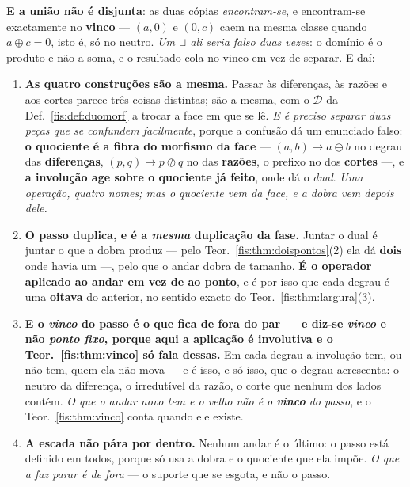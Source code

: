 \documentclass[livro.tex]{subfiles}
\begin{document}
\begin{teorema}
\smallskip\noindent\textbf{E a união não é disjunta}: as duas cópias
\emph{encontram-se}, e encontram-se exactamente no \textbf{vinco} --- $(a,0)$ e
$(0,c)$ caem na mesma classe quando $a\oplus c=0$, isto é, só no neutro. \emph{Um
$\sqcup$ ali seria falso duas vezes}: o domínio é o produto e não a soma, e o
resultado cola no vinco em vez de separar. E daí:
\begin{enumerate}\itemsep3pt
\item[(1)] \textbf{As quatro construções são a mesma.} Passar às diferenças, às
razões e aos cortes parece três coisas distintas; são a mesma, com o
$\mathcal{D}$ da Def.~\ref{fis:def:duomorf} a trocar a face em que se lê.
\emph{E é preciso separar duas peças que se confundem facilmente}, porque a
confusão dá um enunciado falso: \textbf{o quociente é a fibra do morfismo da
face} --- $(a,b)\mapsto a\ominus b$ no degrau das \textbf{diferenças},
$(p,q)\mapsto p\oslash q$ no das \textbf{razões}, o prefixo no dos
\textbf{cortes} ---, e \textbf{a involução age sobre o
quociente já feito}, onde dá o \emph{dual}. \emph{Uma operação, quatro nomes; mas
o quociente vem da face, e a dobra vem depois dele.}
\item[(2)] \textbf{O passo duplica, e é a \emph{mesma} duplicação da fase.}
Juntar o dual é juntar o que a dobra produz --- pelo
Teor.~\ref{fis:thm:doispontos}(2) ela dá \textbf{dois} onde havia um ---, pelo
que o andar dobra de tamanho. \textbf{É o operador aplicado ao andar em vez de
ao ponto}, e é por isso que cada degrau é uma \textbf{oitava} do anterior, no
sentido exacto do Teor.~\ref{fis:thm:largura}(3).
\item[(3)] \textbf{E o \emph{vinco} do passo é o que fica de fora do par --- e
diz-se \emph{vinco} e não \emph{ponto fixo}, porque aqui a aplicação \textbf{é}
involutiva e o Teor.~\ref{fis:thm:vinco} só fala dessas.} Em cada
degrau a involução tem, ou não tem, quem ela não mova --- e é isso, e só isso,
que o degrau acrescenta: o neutro da diferença, o irredutível da razão, o corte
que nenhum dos lados contém. \emph{O que o andar novo tem e o velho não é o
\textbf{vinco} do passo}, e o Teor.~\ref{fis:thm:vinco} conta quando ele existe.
\item[(4)] \textbf{A escada não pára por dentro.} Nenhum andar é o último: o
passo está definido em todos, porque só usa a dobra e o quociente que ela impõe.
\emph{O que a faz parar é de fora} --- o suporte que se esgota, e não o passo.
\end{enumerate}
\end{teorema}
\end{document}
